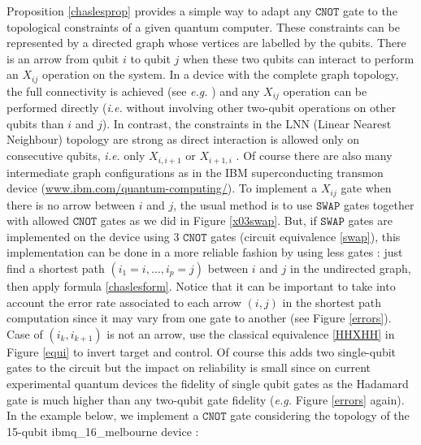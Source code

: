 \documentclass[a4paper,12pt,fleqn]{article}
\newcommand\swap{\mathtt{SWAP}}
\newcommand\cnot{\mathtt{CNOT}}
\begin{document}
Proposition \ref{chaslesprop} provides a simple way to adapt any $\cnot$ gate to the topological constraints of a given quantum computer. These constraints can be
represented by a directed graph whose vertices are labelled by the qubits. There is an arrow from qubit $i$ to qubit $j$ when these two qubits can interact to perform an  $X_{ij}$  operation on the system. In a device with the complete graph topology, the full connectivity is achieved (see \textit{e.g.} \cite{2017Monroe,2019Wright}) and any $X_{ij}$ operation can be performed directly
(\textit{i.e.} without involving other two-qubit operations on other qubits than $i$ and $j$). In contrast, the constraints in the LNN (Linear Nearest Neighbour) topology are strong as direct interaction is allowed only on
consecutive qubits, \textit{i.e.} only $X_{i,i+1}$ or $X_{i+1,i}$ \cite{2016Zajac}. Of course there are also many intermediate graph configurations as in the IBM superconducting transmon device  (\url{www.ibm.com/quantum-computing/}).
To implement a $X_{ij}$ gate when there is no arrow between $i$ and $j$, the usual method is to use $\swap$ gates together with allowed $\cnot$ gates as we did in Figure \ref{x03swap}. But, if $\swap$ gates are implemented on the device using 3 $\cnot$ gates (circuit equivalence \eqref{swap}), this implementation can be done in a more reliable fashion by using less gates : just find a shortest path $(i_1=i, \dots, i_p=j)$ between $i$ and $j$ in the undirected graph, then apply formula \eqref{chaslesform}.
Notice that it can be important to take into account the error rate associated to each arrow $(i,j)$ in the shortest path computation since it may vary from one gate to another (see Figure \ref{errors}). Case of $(i_k,i_{k+1})$ is not an arrow, use the classical equivalence \ref{HHXHH}  in Figure \ref{equi} to invert target and control. Of course this adds two single-qubit gates to the circuit but the impact on reliability is small since on current experimental quantum devices the fidelity of single qubit gates as the Hadamard gate is much higher than any two-qubit gate fidelity (\textit{e.g.} Figure \ref{errors} again). In the example below, we implement a $\cnot$ gate considering the topology of the 15-qubit ibmq\_16\_melbourne device :
\end{document}
